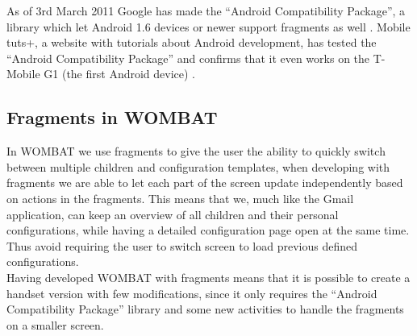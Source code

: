 As of 3rd March 2011 Google has made the "`Android Compatibility Package"', a library which let Android 1.6 devices or newer support fragments as well \cite{web:android:fragments:support}.
Mobile tuts+, a website with tutorials about Android development, has tested the "`Android Compatibility Package"' and confirms that it even works on the T-Mobile G1 (the first Android device) \cite{web:android:fragments:compatibility}.
 
\subsection{Fragments in WOMBAT}
In WOMBAT we use fragments to give the user the ability to quickly switch between multiple children and configuration templates, when developing with fragments we are able to let each part of the screen update independently based on actions in the fragments.
This means that we, much like the Gmail application, can keep an overview of all children and their personal configurations, while having a detailed configuration page open at the same time.
Thus avoid requiring the user to switch screen to load previous defined configurations.\\

Having developed WOMBAT with fragments means that it is possible to create a handset version with few modifications, since it only requires the "`Android Compatibility Package"' library and some new activities to handle the fragments on a smaller screen.